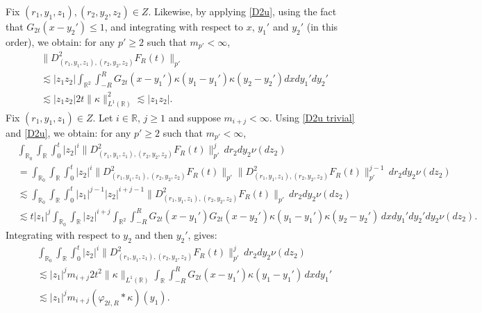 \documentclass[12pt]{article}
\def\bR{\mathbb{R}}
\newcommand{\les}{\lesssim}
\def\k{\kappa}
\begin{document}
Fix $(r_1,y_1,z_1),(r_2,y_2,z_2) \in Z$. Likewise, by applying \eqref{D2u}, using the fact that $G_{2t}(x-y_2') \leq 1$, and integrating with respect to $x$, $y_1'$ and $y_2'$ (in this order), we obtain: for any $p'\geq 2$ such that $m_{p'}<\infty$,
\begin{align}
\nonumber
& \|D_{(r_1,y_1,z_1),(r_2,y_2,z_2)}^2 F_R(t)\|_{p'} \\
\nonumber
& \les |z_1 z_2| \int_{\bR^2} \int_{-R}^R G_{2t}(x-y_1')\k(y_1-y_1')\k(y_2-y_2')dxdy_1'dy_2' \\
\label{D2u trivial}
& \les |z_1z_2|2t \|\k\|_{L^1(\bR)}^2 \les |z_1z_2|.
\end{align}
Fix $(r_1,y_1,z_1) \in Z$. Let $i \in \bR$, $j \geq 1$ and suppose $m_{i+j} < \infty$. Using \eqref{D2u trivial} and \eqref{D2u}, we obtain: for any $p'\geq 2$ such that $m_{p'}<\infty$,
\begin{align}
\nonumber
& \int_{\bR_0} \int_{\bR} \int_0^t  |z_2|^i\| D^2_{(r_1,y_1,z_1),(r_2,y_2,z_2)} F_R(t) \|_{p'}^j \, dr_2 dy_2 \nu(dz_2)\\
\nonumber
& = \int_{\bR_0} \int_{\bR} \int_0^t  |z_2|^i\| D^2_{(r_1,y_1,z_1),(r_2,y_2,z_2)} F_R(t) \|_{p'}\| D^2_{(r_1,y_1,z_1),(r_2,y_2,z_2)} F_R(t) \|_{p'}^{j-1} \, dr_2 dy_2 \nu(dz_2)\\
\nonumber
& \les\int_{\bR_0} \int_{\bR} \int_0^t   |z_1|^{j-1}  |z_2|^{i+ j-1}\| D^2_{(r_1,y_1,z_1),(r_2,y_2,z_2)} F_R(t) \|_{p'} \, dr_2 dy_2 \nu(dz_2)\\
\nonumber
& \les t|z_1|^j \int_{\bR_0} \int_{\bR}  |z_2|^{i+j} \int_{\bR^2}\int_{-R}^R G_{2t}(x-y_1')G_{2t}(x-y_2')\k(y_1-y_1')\k(y_2-y_2') \, dx dy_1'dy_2'  dy_2 \nu(dz_2).
\end{align}
Integrating with respect to $y_2$ and then $y_2'$, gives: %
\begin{align}
\nonumber
& \int_{\bR_0} \int_{\bR} \int_0^t  |z_2|^i\| D^2_{(r_1,y_1,z_1),(r_2,y_2,z_2)} F_R(t) \|_{p'}^j \, dr_2 dy_2 \nu(dz_2)\\
\nonumber
& \les  |z_1|^j m_{i+j}2t^2 \| \k\|_{L^1(\bR)}   \int_{\bR} \int_{-R}^R G_{2t}(x-y_1')\k(y_1-y_1')  \, dxdy_1'  \\
\label{D2u v2}
& \les  |z_1|^j m_{i+j} (\varphi_{2t,R} * \k)(y_1).
\end{align}
\end{document}
